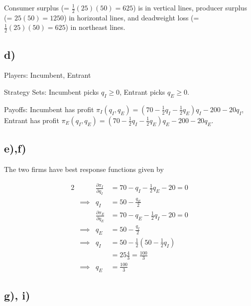 \documentclass[12pt,letterpaper]{article}
\theoremstyle{definition}
\begin{document}
Consumer surplus (= $\frac{1}{2}(25)(50) = 625$) is in vertical lines, producer
surplus (= $25(50) = 1250$) in horizontal lines, and
deadweight loss (= $\frac{1}{2}(25)(50) = 625$) in northeast lines.


\subsection*{d)}

Players: Incumbent, Entrant

Strategy Sets: Incumbent picks $q_I \geq 0$, Entrant picks $q_E \geq 0$.

Payoffs: Incumbent has profit $\pi_I(q_I,q_E) = (70 - \frac{1}{2}q_I - \frac{1}{2}q_E)q_I - 200 -
20q_I$, Entrant has profit $\pi_E(q_I,q_E) = (70 - \frac{1}{2}q_I - \frac{1}{2}q_E)q_E - 200 - 20q_E$.

\subsection*{e),f)}

The two firms have best response functions given by

\begin{alignat*}{2}
  &&\frac{\partial \pi_I}{\partial q_I} &= 70 -q_I - \frac{1}{2}q_E - 20 = 0\\
  &\implies& q_I &= 50 - \frac{q_E}{2} \\
  &&\frac{\partial \pi_E}{\partial q_E} &= 70 -q_E - \frac{1}{2}q_I - 20 = 0\\
  &\implies& q_E &= 50 - \frac{q_I}{2} \\
  &\implies& q_I &= 50 - \frac{1}{2}(50 - \frac{1}{2}q_I) \\
  && &= 25\frac{4}{3} = \frac{100}{3}\\
  &\implies& q_E &= \frac{100}{3}
\end{alignat*}

\subsection*{g), i)}
\end{document}
